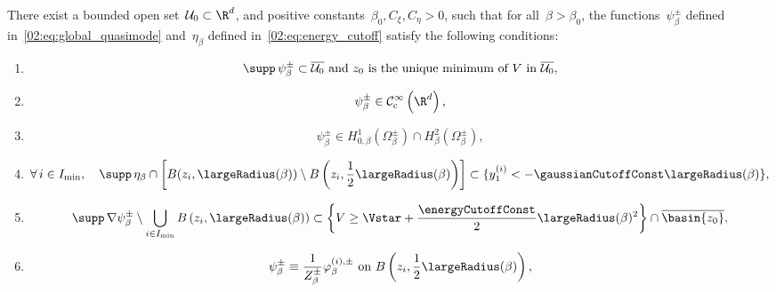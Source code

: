             \begin{proposition} 
                \label{02:prop:qm_energy_estimates}
                There exist a bounded open set~$\mathcal U_0\subset\R^d$, and positive constants~$\beta_0,C_\xi,C_\eta>0$, such that for all~$\beta>\beta_0$,
                the functions~$\psi_\beta^\pm$ defined in~\eqref{02:eq:global_quasimode} and~$\eta_\beta$ defined in~\eqref{02:eq:energy_cutoff} satisfy the following conditions:
                \begin{enumerate}[]
                    \item{\begin{equation}\label{02:eq:quasimode_support}
                        \supp\,\psi_\beta^\pm \subset \overline{\mathcal U_0} \text{ and $z_0$ is the unique minimum of~$V$ in~$\overline{\mathcal U_0}$},
                    \end{equation}}
                    \item{
                        \begin{equation}
                        \label{02:eq:quasimode_smooth}
                        \psi_\beta^\pm \in\mathcal{C}_{\mathrm{c}}^\infty\left(\R^d\right),
                        \end{equation}
                    }
                    \item{
                        \begin{equation}
                            \label{02:eq:quasimode_boundary_condition}
                            \psi_\beta^{\pm} \in H_{0,\beta}^1(\Omega_\beta^\pm)\cap H_\beta^2(\Omega_\beta^\pm),%
                        \end{equation}
                    }
                    \item{\begin{equation}\label{02:eq:energy_cutoff_support}
                        \forall\,i\in I_{\min},\quad\supp\,\eta_\beta \cap \left[B(z_i,\largeRadius(\beta))\setminus B\left(z_i,\frac12\largeRadius(\beta)\right)\right] \subset \{y_1^{(i)}<-\gaussianCutoffConst \largeRadius(\beta)\},
                    \end{equation}
                    }
                    \item{\begin{equation}\label{02:eq:quasimode_high_energy}
                        \supp\,\nabla \psi_\beta^\pm \setminus \bigcup_{i\in I_{\min}} B\left(z_i,\largeRadius(\beta)\right) \subset \left\{ V \geq \Vstar + \frac{\energyCutoffConst}2\largeRadius(\beta)^2\right\}\cap \overline{\basin{z_0}},
                    \end{equation}}
                    \item{\begin{equation}\label{02:eq:quasimode_locally_fine}
                        \psi_\beta^\pm \equiv \frac1{Z_\beta^\pm}\varphi_\beta^{(i),\pm}\text{ on }B\left(z_i,\frac12\largeRadius(\beta)\right),
                    \end{equation}}


\end{enumerate}
\end{proposition}

